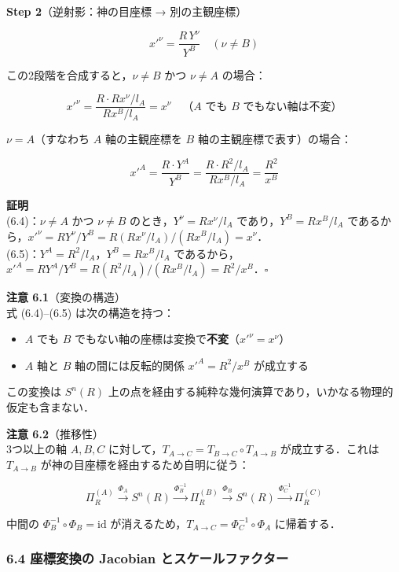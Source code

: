 \documentclass[a4paper,11pt]{ltjsarticle}
\theoremstyle{definition}
\providecommand{\tightlist}{\setlength{\itemsep}{0pt}\setlength{\parskip}{0pt}}
\begin{document}
\textbf{Step 2}（逆射影：神の目座標 → 別の主観座標）

\[x'^\nu = \frac{R\,Y^\nu}{Y^B} \quad (\nu \neq B) \tag{6.3}\]

この2段階を合成すると，\(\nu \neq B\) かつ \(\nu \neq A\) の場合：

\[x'^\nu = \frac{R \cdot Rx^\nu / l_A}{Rx^B/l_A} = x^\nu \quad \text{（$A$ でも $B$ でもない軸は不変）} \tag{6.4}\]

\(\nu = A\)（すなわち \(A\) 軸の主観座標を \(B\) 軸の主観座標で表す）の場合：

\[x'^A = \frac{R \cdot Y^A}{Y^B} = \frac{R \cdot R^2/l_A}{Rx^B/l_A} = \frac{R^2}{x^B} \tag{6.5}\]

\textbf{証明}\\
(6.4)：\(\nu \neq A\) かつ \(\nu \neq B\) のとき，\(Y^\nu = Rx^\nu/l_A\) であり，\(Y^B = Rx^B/l_A\) であるから，\(x'^\nu = RY^\nu/Y^B = R(Rx^\nu/l_A)/(Rx^B/l_A) = x^\nu\)．\\
(6.5)：\(Y^A = R^2/l_A\)，\(Y^B = Rx^B/l_A\) であるから，\(x'^A = RY^A/Y^B = R(R^2/l_A)/(Rx^B/l_A) = R^2/x^B\)．\(\square\)

\textbf{注意 6.1}（変換の構造）\\
式 (6.4)--(6.5) は次の構造を持つ：

\begin{itemize}
\tightlist
\item
  \(A\) でも \(B\) でもない軸の座標は変換で\textbf{不変}（\(x'^\nu = x^\nu\)）
\item
  \(A\) 軸と \(B\) 軸の間には反転的関係 \(x'^A = R^2/x^B\) が成立する
\end{itemize}

この変換は \(S^n(R)\) 上の点を経由する純粋な幾何演算であり，いかなる物理的仮定も含まない．

\textbf{注意 6.2}（推移性）\\
3つ以上の軸 \(A, B, C\) に対して，\(T_{A \to C} = T_{B \to C} \circ T_{A \to B}\) が成立する．これは \(T_{A \to B}\) が神の目座標を経由するため自明に従う：

\[\Pi_R^{(A)} \xrightarrow{\Phi_A} S^n(R) \xrightarrow{\Phi_B^{-1}} \Pi_R^{(B)} \xrightarrow{\Phi_B} S^n(R) \xrightarrow{\Phi_C^{-1}} \Pi_R^{(C)}\]

中間の \(\Phi_B^{-1} \circ \Phi_B = \mathrm{id}\) が消えるため，\(T_{A \to C} = \Phi_C^{-1} \circ \Phi_A\) に帰着する．

\subsubsection{6.4 座標変換の Jacobian とスケールファクター}\label{ux5ea7ux6a19ux5909ux63dbux306e-jacobian-ux3068ux30b9ux30b1ux30fcux30ebux30d5ux30a1ux30afux30bfux30fc}
\end{document}
